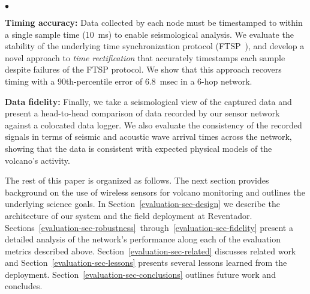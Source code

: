 \begin{list}{$\bullet$}{\setlength{\topsep}{0.05in}
                        \setlength{\leftmargin}{0.15in}
                        \setlength{\itemsep}{0.05in}}
%
\item 
{\bf Timing accuracy:} Data collected by each node must be timestamped to
within a single sample time (10~ms) to enable seismological analysis. We
evaluate the stability of the underlying time synchronization protocol
(FTSP~\cite{ftsp}), and develop a novel approach to {\em time rectification}
that accurately timestamps each sample despite failures of the FTSP protocol.
We show that this approach recovers timing with a 90th-percentile error of
6.8~msec in a 6-hop network.
%
%
\item 
{\bf Data fidelity:} Finally, we take a seismological view of the captured
data and present a head-to-head comparison of data recorded by our sensor
network against a colocated data logger.  We also evaluate the consistency of
the recorded signals in terms of seismic and acoustic wave arrival times
across the network, showing that the data is consistent with expected
physical models of the volcano's activity.
%
\end{list}

The rest of this paper is organized as follows. The next section provides
background on the use of wireless sensors for volcano monitoring and outlines
the underlying science goals. In Section~\ref{evaluation-sec-design} we
describe the architecture of our system and the field deployment at
Reventador.
Sections~\ref{evaluation-sec-robustness}~through~\ref{evaluation-sec-fidelity}
present a detailed analysis of the network's performance along each of the
evaluation metrics described above. Section~\ref{evaluation-sec-related}
discusses related work and Section~\ref{evaluation-sec-lessons} presents
several lessons learned from the deployment.
Section~\ref{evaluation-sec-conclusions} outlines future work and concludes.

